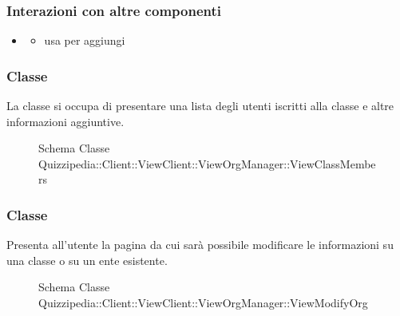 \subsubsection{Interazioni con altre componenti}
\begin{itemize}
\item {}
\begin{itemize}
\item usa  per aggiungi
\end{itemize}
\end{itemize}
\subsubsection{Classe }
La classe si occupa di presentare una lista degli utenti iscritti alla classe e altre informazioni aggiuntive.
\begin{figure}[H]
\centering
\noindent{}
\caption[Schema Classe ViewClassMembers]{Schema Classe Quizzipedia::Client::ViewClient::ViewOrgManager::ViewClassMembers}
\end{figure}
\subsubsection{Classe }
Presenta all'utente la pagina da cui sarà possibile modificare le informazioni su una classe o su un ente esistente.
\begin{figure}[H]
\centering
\noindent{}
\caption[Schema Classe ViewModifyOrg]{Schema Classe Quizzipedia::Client::ViewClient::ViewOrgManager::ViewModifyOrg}
\end{figure}

